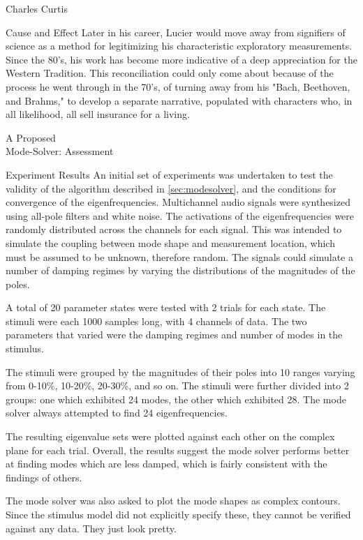 \documentclass[a4paper,10pt]{report}
\numberwithin{equation}{section}
\begin{document}
\begin{chapter}{Charles Curtis}
\begin{section}{Cause and Effect}
Later in his career, Lucier would move away from signifiers of science as a method for legitimizing his characteristic exploratory measurements. Since the 80's, his work has become more indicative of a deep appreciation for the Western Tradition. This reconciliation could only come about because of the process he went through in the 70's, of turning away from his "Bach, Beethoven, and Brahms,"\cite[p.~1]{lucier2012} to develop a separate narrative, populated with characters who, in all likelihood, all sell insurance for a living.
\end{section}

\end{chapter}
\begin{chapter}{A Proposed \\Mode-Solver: Assessment}
 \begin{section}{Experiment Results}\label{sec:exp_results}
An initial set of experiments was undertaken to test the validity of the algorithm described in \ref{sec:modesolver}, and the conditions for convergence of the eigenfrequencies. Multichannel audio signals were synthesized using all-pole filters and white noise. The activations of the eigenfrequencies were randomly distributed across the channels for each signal. This was intended to simulate the coupling between mode shape and measurement location, which must be assumed to be unknown, therefore random. The signals could simulate a number of damping regimes by varying the distributions of the magnitudes of the poles. 

A total of 20 parameter states were tested with 2 trials for each state. The stimuli were each 1000 samples long, with 4 channels of data. The two parameters that varied were the damping regimes and number of modes in the stimulus. 

The stimuli were grouped by the magnitudes of their poles into 10 ranges varying from 0-10\%, 10-20\%, 20-30\%, and so on. The stimuli were further divided into 2 groups: one which exhibited 24 modes, the other which exhibited 28. The mode solver always attempted to find 24 eigenfrequencies.

The resulting eigenvalue sets were plotted against each other on the complex plane for each trial. Overall, the results suggest the mode solver performs better at finding modes which are less damped, which is fairly consistent with the findings of others. \cite{Chen2012} \cite{Feeny1998} \cite{Kerschen2002} \cite{Han2003} 

The mode solver was also asked to plot the mode shapes as complex contours. Since the stimulus model did not explicitly specify these, they cannot be verified against any data. They just look pretty.


\end{section}
\end{chapter}
\end{document}
